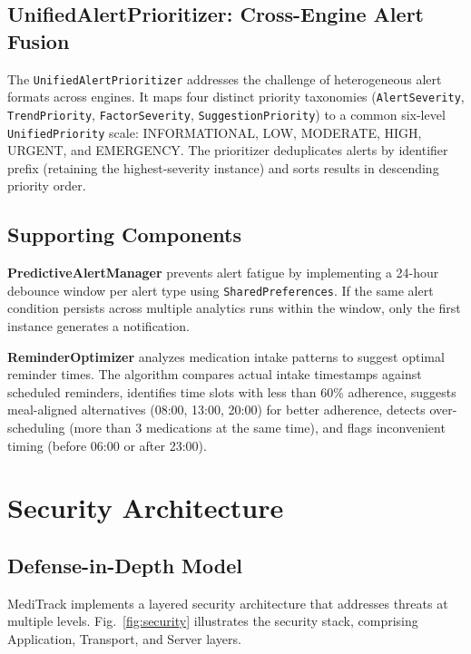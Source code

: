 \documentclass[journal,onecolumn,web]{ieeecolor}
\begin{document}
\subsection{UnifiedAlertPrioritizer: Cross-Engine
Alert Fusion}
The {\tt UnifiedAlertPrioritizer} addresses the
challenge of heterogeneous alert formats across
engines. It maps four distinct priority taxonomies
({\tt AlertSeverity}, {\tt TrendPriority},
{\tt FactorSeverity}, {\tt SuggestionPriority}) to a
common six-level {\tt UnifiedPriority} scale:
INFORMATIONAL, LOW, MODERATE, HIGH, URGENT, and
EMERGENCY. The prioritizer deduplicates alerts by
identifier prefix (retaining the highest-severity
instance) and sorts results in descending priority
order.

\subsection{Supporting Components}
{\bf PredictiveAlertManager} prevents alert fatigue
by implementing a 24-hour debounce window per alert
type using {\tt SharedPreferences}. If the same alert
condition persists across multiple analytics runs
within the window, only the first instance generates
a notification.

{\bf ReminderOptimizer} analyzes medication intake
patterns to suggest optimal reminder times. The
algorithm compares actual intake timestamps against
scheduled reminders, identifies time slots with less
than 60\% adherence, suggests meal-aligned
alternatives (08:00, 13:00, 20:00) for better
adherence, detects over-scheduling (more than 3
medications at the same time), and flags inconvenient
timing (before 06:00 or after 23:00).


\section{Security Architecture}
\label{sec:security}

\subsection{Defense-in-Depth Model}
MediTrack implements a layered security architecture
that addresses threats at multiple levels.
Fig.~\ref{fig:security} illustrates the security
stack, comprising Application, Transport, and Server
layers.
\end{document}
